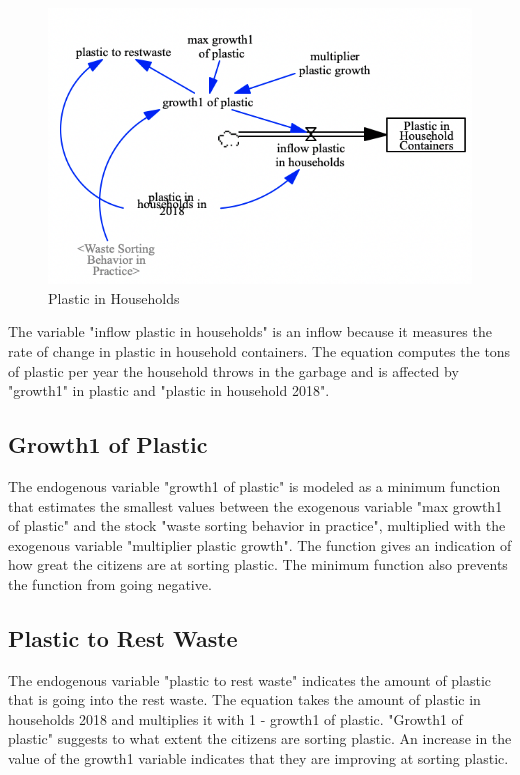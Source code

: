 \begin{figure}[H]
\centering
\includegraphics [scale=0.34,angle=360]{figures/plasticinflow.png}
\caption{Plastic in Households}
\label{fig:plasticinflow}
\end{figure}

\indent \newline
The variable "inflow plastic in households" is an inflow because it measures the rate of change in plastic in household containers. The equation computes the tons of plastic per year the household throws in the garbage and is affected by "growth1" in plastic and "plastic in household 2018".

\subsection{Growth1 of Plastic}

\indent \newline
The endogenous variable  "growth1 of plastic" is modeled as a minimum function that estimates the smallest values between the exogenous variable "max growth1 of plastic" and the stock "waste sorting behavior in practice", multiplied with the exogenous variable "multiplier plastic growth". The function gives an indication of how great the citizens are at sorting plastic. The minimum function also prevents the function from going negative. 

\subsection{Plastic to Rest Waste}

\indent \newline
The endogenous variable "plastic to rest waste" indicates the amount of plastic that is going into the rest waste. The equation takes the amount of plastic in households 2018 and multiplies it with 1 - growth1 of plastic. "Growth1 of plastic" suggests to what extent the citizens are sorting plastic. An increase in the value of the growth1 variable indicates that they are improving at sorting plastic. 

